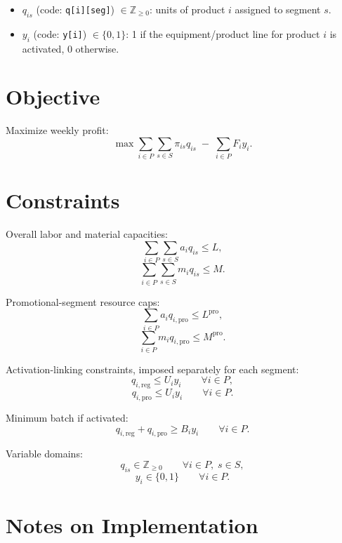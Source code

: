 \begin{itemize}
    \item $q_{is}$ (code: \texttt{q[i][seg]}) $\in \mathbb{Z}_{\ge 0}$: units of product $i$ assigned to segment $s$.
    \item $y_i$ (code: \texttt{y[i]}) $\in \{0,1\}$: 1 if the equipment/product line for product $i$ is activated, 0 otherwise.
\end{itemize}

\section*{Objective}

Maximize weekly profit:
\[
\max \sum_{i \in P}\sum_{s \in S}\pi_{is} q_{is} \;-\; \sum_{i \in P} F_i y_i.
\]

\section*{Constraints}

Overall labor and material capacities:
\[
\sum_{i \in P}\sum_{s \in S} a_i q_{is} \le L,
\]
\[
\sum_{i \in P}\sum_{s \in S} m_i q_{is} \le M.
\]

Promotional-segment resource caps:
\[
\sum_{i \in P} a_i q_{i,\mathrm{pro}} \le L^{\mathrm{pro}},
\]
\[
\sum_{i \in P} m_i q_{i,\mathrm{pro}} \le M^{\mathrm{pro}}.
\]

Activation-linking constraints, imposed separately for each segment:
\[
q_{i,\mathrm{reg}} \le U_i y_i \qquad \forall i \in P,
\]
\[
q_{i,\mathrm{pro}} \le U_i y_i \qquad \forall i \in P.
\]

Minimum batch if activated:
\[
q_{i,\mathrm{reg}} + q_{i,\mathrm{pro}} \ge B_i y_i
\qquad \forall i \in P.
\]

Variable domains:
\[
q_{is} \in \mathbb{Z}_{\ge 0} \qquad \forall i \in P,\; s \in S,
\]
\[
y_i \in \{0,1\} \qquad \forall i \in P.
\]

\section*{Notes on Implementation}

